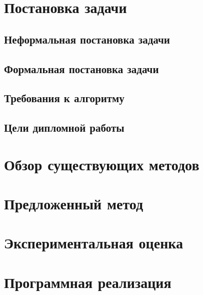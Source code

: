 \documentclass[12pt, a4paper]{article}
\begin{document}
\newpage
\section{Постановка задачи}

\subsection{Неформальная постановка задачи}

\subsection{Формальная постановка задачи}

\subsection{Требования к алгоритму}

\subsection{Цели дипломной работы}


\newpage
\section{Обзор существующих методов}

\newpage
\section{Предложенный метод}


\newpage
\section{Экспериментальная оценка}

\newpage
\section{Программная реализация}
\end{document}
